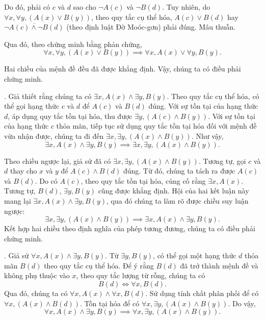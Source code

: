 Do đó, phải có $c$ và $d$ sao cho $\neg A(c)$ và $\neg B(d)$. Tuy nhiên, do $\forall x, \forall y, (A(x) \lor B(y))$, theo quy tắc cụ thể hóa, $A(c) \lor B(d)$ hay $\overline{\neg A(c) \land \neg B(d)}$ (theo định luật Đờ Moóc-gơn) phải đúng. Mâu thuẫn.

Qua đó, theo chứng minh bằng phản chứng, 
\begin{equation*}
    \forall x, \forall y, (A(x) \lor B(y)) \implies \forall x, A(x) \lor \forall y, B(y).
\end{equation*}

Hai chiều của mệnh đề đều đã được khẳng định. Vậy, chúng ta có điều phải chứng minh.

. Giả thiết rằng chúng ta có $\exists x, A(x) \land \exists y, B(y)$. 
Theo quy tắc cụ thể hóa, có thể gọi hạng thức $c$ và $d$ để $A(c)$ và $B(d)$ đúng. 
Với sự tồn tại của hạng thức $d$, áp dụng quy tắc tồn tại hóa, thu được $\exists y, (A(c) \land B(y))$.
Với sự tồn tại của hạng thức $c$ thỏa mãn, tiếp tục sử dụng quy tắc tồn tại hóa đối với mệnh đề vừa nhận được, chúng ta đi đến $\exists x, \exists y, (A(x) \land B(y))$.
Như vậy,
\begin{equation*}
    \exists x, A(x) \land \exists y, B(y) \implies \exists x, \exists y, (A(x) \land B(y)).
\end{equation*}

Theo chiều ngược lại, giả sử đã có $\exists x, \exists y, (A(x) \land B(y))$. 
Tương tự, gọi $c$ và $d$ thay cho $x$ và $y$ để $A(c) \land B(d)$ đúng. Từ đó, chúng ta tách ra được $A(c)$ và $B(d)$. Do có $A(c)$, theo quy tắc tồn tại hóa, củng cố rằng $\exists x, A(x)$. Tương tự, $B(d)$, $\exists y, B(y)$ cũng được khẳng định. 
Hội của hai kết luận này mang lại $\exists x, A(x) \land \exists y, B(y)$, qua đó chúng ta làm rõ được chiều suy luận ngược:
\begin{equation*}
    \exists x, \exists y, (A(x) \land B(y)) \implies \exists x, A(x) \land \exists y, B(y).
\end{equation*}
Kết hợp hai chiều theo định nghĩa của phép tương đương, chúng ta có điều phải chứng minh.

. Giả sử $\forall x, A(x) \land \exists y, B(y)$. Từ $\exists y, B(y)$, có thể gọi một hạng thức $d$ thỏa mãn $B(d)$ theo quy tắc cụ thể hóa. Để ý rằng $B(d)$ đã trở thành mệnh đề và không phụ thuộc vào $x$, theo quy tắc lượng từ rỗng, chúng ta có
$$B(d) \iff \forall x, B(d).$$
Qua đó, chúng ta có $\forall x, A(x) \land \forall x, B(d)$. Sử dụng tính chất phân phối để có $\forall x, (A(x) \land B(d))$. Tồn tại hóa để có $\forall x, \exists y, (A(x) \land B(y))$. Do vậy,
\begin{equation*}
    \forall x, A(x) \land \exists y, B(y) \implies \forall x, \exists y, (A(x) \land B(y)).
\end{equation*}

